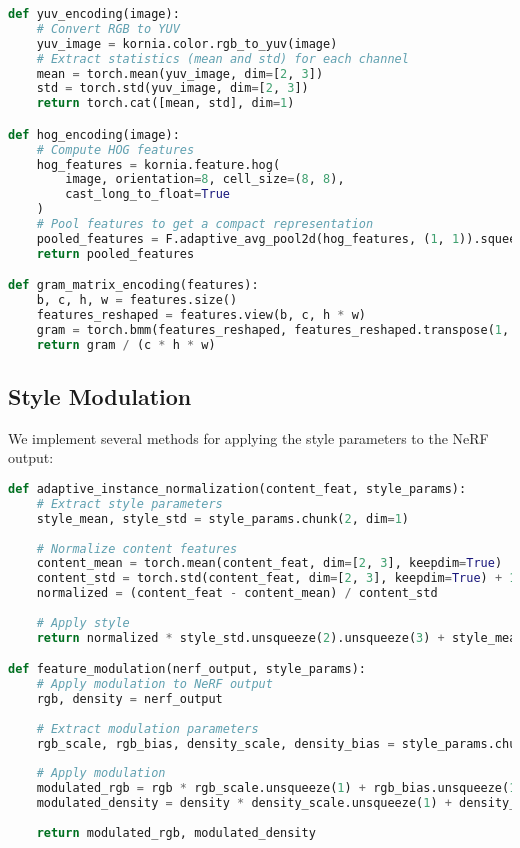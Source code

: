 \begin{lstlisting}[language=Python]
def yuv_encoding(image):
    # Convert RGB to YUV
    yuv_image = kornia.color.rgb_to_yuv(image)
    # Extract statistics (mean and std) for each channel
    mean = torch.mean(yuv_image, dim=[2, 3])
    std = torch.std(yuv_image, dim=[2, 3])
    return torch.cat([mean, std], dim=1)

def hog_encoding(image):
    # Compute HOG features
    hog_features = kornia.feature.hog(
        image, orientation=8, cell_size=(8, 8), 
        cast_long_to_float=True
    )
    # Pool features to get a compact representation
    pooled_features = F.adaptive_avg_pool2d(hog_features, (1, 1)).squeeze()
    return pooled_features

def gram_matrix_encoding(features):
    b, c, h, w = features.size()
    features_reshaped = features.view(b, c, h * w)
    gram = torch.bmm(features_reshaped, features_reshaped.transpose(1, 2))
    return gram / (c * h * w)
\end{lstlisting}

\subsection{Style Modulation}
We implement several methods for applying the style parameters to the NeRF output:

\begin{lstlisting}[language=Python]
def adaptive_instance_normalization(content_feat, style_params):
    # Extract style parameters
    style_mean, style_std = style_params.chunk(2, dim=1)
    
    # Normalize content features
    content_mean = torch.mean(content_feat, dim=[2, 3], keepdim=True)
    content_std = torch.std(content_feat, dim=[2, 3], keepdim=True) + 1e-5
    normalized = (content_feat - content_mean) / content_std
    
    # Apply style
    return normalized * style_std.unsqueeze(2).unsqueeze(3) + style_mean.unsqueeze(2).unsqueeze(3)

def feature_modulation(nerf_output, style_params):
    # Apply modulation to NeRF output
    rgb, density = nerf_output
    
    # Extract modulation parameters
    rgb_scale, rgb_bias, density_scale, density_bias = style_params.chunk(4, dim=1)
    
    # Apply modulation
    modulated_rgb = rgb * rgb_scale.unsqueeze(1) + rgb_bias.unsqueeze(1)
    modulated_density = density * density_scale.unsqueeze(1) + density_bias.unsqueeze(1)
    
    return modulated_rgb, modulated_density
\end{lstlisting}

